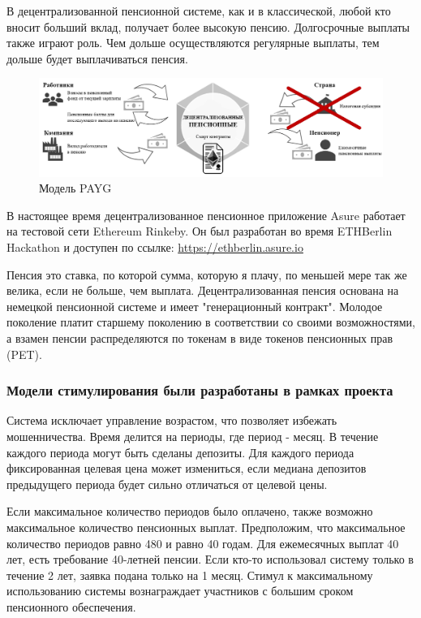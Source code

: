 В децентрализованной пенсионной системе, как и в классической, любой кто вносит больший вклад, получает более высокую пенсию. Долгосрочные выплаты также играют роль. Чем дольше осуществляются регулярные выплаты, тем дольше будет выплачиваться пенсия.

\begin{figure}[H]
    \centering
    \includegraphics[width=5.0in]{img/pension.png}
    \caption{Модель PAYG}
    \label{fig:payg}
\end{figure}

В настоящее время децентрализованное пенсионное приложение Asure работает на тестовой сети Ethereum Rinkeby. Он был разработан во время ETHBerlin Hackathon и доступен по ссылке: 
\url{https://ethberlin.asure.io}

Пенсия это ставка, по которой сумма, которую я плачу, по меньшей мере так же велика, если не больше, чем выплата. Децентрализованная пенсия основана на немецкой пенсионной системе и имеет "генерационный контракт". Молодое поколение платит старшему поколению в соответствии со своими возможностями, а взамен пенсии распределяются по токенам в виде токенов пенсионных прав (PET).
\newline\newline

\subsubsection*{Модели стимулирования были разработаны в рамках проекта}
Система исключает управление возрастом, что позволяет избежать мошенничества. Время делится на периоды, где период - месяц. В течение каждого периода могут быть сделаны депозиты. Для каждого периода фиксированная целевая цена может измениться, если медиана депозитов предыдущего периода будет сильно отличаться от целевой цены. 

Если максимальное количество периодов было оплачено, также возможно максимальное количество пенсионных выплат. Предположим, что максимальное количество периодов равно 480 и равно 40 годам. Для ежемесячных выплат 40 лет, есть требование 40-летней пенсии. Если кто-то использовал систему только в течение 2 лет, заявка подана только на 1 месяц. Стимул к максимальному использованию системы вознаграждает участников с большим сроком пенсионного обеспечения.

